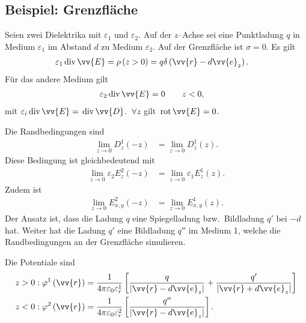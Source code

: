 \documentclass[a4paper,12pt]{article}
\numberwithin{equation}{section}
\begin{document}
\subsection{Beispiel: Grenzfläche}
Seien zwei Dielektrika mit $\varepsilon _1$ und $\varepsilon _2$. Auf der $z$--Achse sei eine Punktladung $q$ in Medium $\varepsilon _1$ im Abstand $d$ zu Medium $\varepsilon _2$. Auf der Grenzfläche ist $\sigma =0$.
Es gilt
\begin{align} 
        \varepsilon _1\,\text{div}\,\vv{E}&=\rho \left(z>0\right)=q\delta \left(\vv{r}-d\vv{e}_z\right)
.\end{align} 
Für das andere Medium gilt
\begin{align} 
        \varepsilon _2\,\text{div}\,\vv{E}&=0\qquad z<0
,\end{align} 
mit $\varepsilon _i\,\text{div}\,\vv{E}=\,\text{div}\,\vv{D}$.
$\,\forall z$ gilt $\,\text{rot}\,\vv{E}=0$.\par
Die Randbedingungen sind
\begin{align} 
        \lim_{z\rightarrow 0}D_z^1\left(-z\right)&=\lim_{z\rightarrow 0}D_z^1\left(z\right)
.\end{align} 
Diese Bedingung ist gleichbedeutend mit
\begin{align} 
        \lim_{z\rightarrow 0}\varepsilon _2E_z^2\left(-z\right)&=\lim_{z\rightarrow 0}\varepsilon _1E_z^1\left(z\right)
.\end{align} 
Zudem ist
\begin{align} 
        \lim_{z\rightarrow 0}E_{x,y}^2\left(-z\right)&=\lim_{z\rightarrow 0}E_{x,y}^1\left(z\right)
.\end{align} 
Der Ansatz ist, dass die Ladung $q$ eine Spiegelladung bzw.\ Bildladung $q'$ bei $-d$ hat. Weiter hat die Ladung $q'$ eine Bildladung $q''$ im Medium 1, welche die Randbedingungen an der Grenzfläche simulieren.\par
Die Potentiale sind
\begin{align} 
        z>0&:\varphi ^1\left(\vv{r}\right)=\dfrac{1}{4\pi \varepsilon _0\varepsilon _r^1}\left[\dfrac{q}{|\vv{r}-d\vv{e}_z|}+\dfrac{q'}{|\vv{r}+d\vv{e}_z|}\right]\\
        z<0&:\varphi ^2\left(\vv{r}\right)=\dfrac{1}{4\pi \varepsilon _0\varepsilon _r^2}\left[\dfrac{q''}{|\vv{r}-d\vv{e}_z|}\right]
.\end{align} 


\newpage
\end{document}
